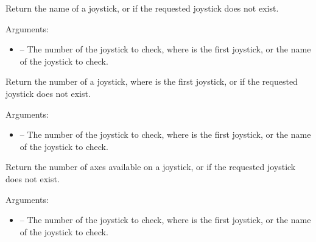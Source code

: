 \documentclass[letterpaper,10pt,english]{sphinxmanual}
\begin{document}

\begin{fulllineitems}
\label{joystick:sge.joystick.get_name}
Return the name of a joystick, or  if the requested
joystick does not exist.

Arguments:
\begin{itemize}
\item {} 
 -- The number of the joystick to check, where 
is the first joystick, or the name of the joystick to check.

\end{itemize}

\end{fulllineitems}


\begin{fulllineitems}
\label{joystick:sge.joystick.get_id}
Return the number of a joystick, where  is the first joystick,
or  if the requested joystick does not exist.

Arguments:
\begin{itemize}
\item {} 
 -- The number of the joystick to check, where 
is the first joystick, or the name of the joystick to check.

\end{itemize}

\end{fulllineitems}


\begin{fulllineitems}
\label{joystick:sge.joystick.get_axes}
Return the number of axes available on a joystick, or  if the
requested joystick does not exist.

Arguments:
\begin{itemize}
\item {} 
 -- The number of the joystick to check, where 
is the first joystick, or the name of the joystick to check.

\end{itemize}

\end{fulllineitems}
\end{document}
